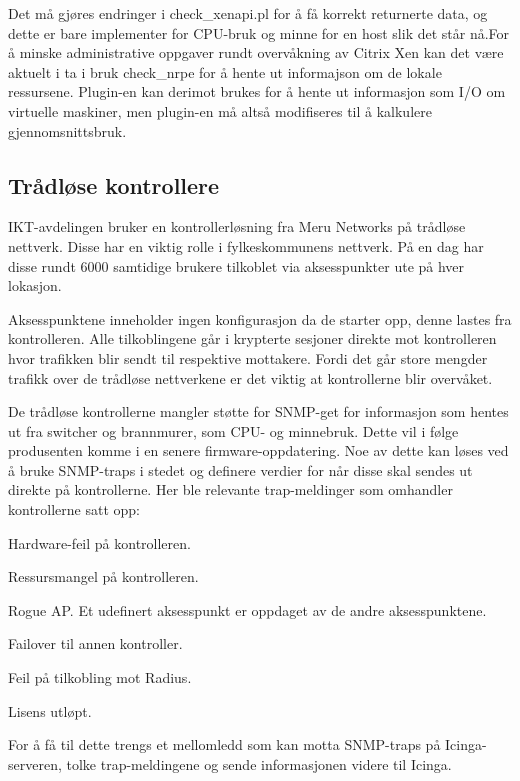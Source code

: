 Det må gjøres endringer i check\_xenapi.pl for å få korrekt returnerte data, og dette er bare implementer for CPU-bruk og minne for en host slik det står nå.For å minske administrative oppgaver rundt overvåkning av Citrix Xen kan det være aktuelt i ta i bruk check\_nrpe for å hente ut informajson om de lokale ressursene. Plugin-en kan derimot brukes for å hente ut informasjon som I/O om virtuelle maskiner, men plugin-en må altså modifiseres til å kalkulere gjennomsnittsbruk.

\clearpage
\subsection{Trådløse kontrollere}
IKT-avdelingen bruker en kontrollerløsning fra Meru Networks på trådløse nettverk. Disse har en viktig rolle i fylkeskommunens nettverk. På en dag har disse rundt 6000 samtidige brukere tilkoblet via aksesspunkter ute på hver lokasjon.

Aksesspunktene inneholder ingen konfigurasjon da de starter opp, denne lastes fra kontrolleren. Alle tilkoblingene går i krypterte sesjoner direkte mot kontrolleren hvor trafikken blir sendt til respektive mottakere. Fordi det går store mengder trafikk over de trådløse nettverkene er det viktig at kontrollerne blir overvåket.

De trådløse kontrollerne mangler støtte for SNMP-get for informasjon som hentes ut fra switcher og brannmurer, som CPU- og minnebruk. Dette vil i følge produsenten komme i en senere firmware-oppdatering. Noe av dette kan løses ved å bruke SNMP-traps i stedet og definere verdier for når disse skal sendes ut direkte på kontrollerne. Her ble relevante trap-meldinger som omhandler kontrollerne satt opp:
\begin{itemize*}
	\item Hardware-feil på kontrolleren.
	\item Ressursmangel på kontrolleren.
	\item Rogue AP. Et udefinert aksesspunkt er oppdaget av de andre aksesspunktene.
	\item Failover til annen kontroller.
	\item Feil på tilkobling mot Radius.
	\item Lisens utløpt.
\end{itemize*}

For å få til dette trengs et mellomledd som kan motta SNMP-traps på Icinga-serveren, tolke trap-meldingene og sende informasjonen videre til Icinga. 

